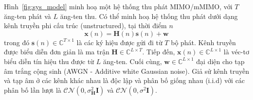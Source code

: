 Hình~\ref{fig:sys_model} minh hoạ một hệ thống thu phát MIMO/mMIMO, với $T$ ăng-ten phát và $L$ ăng-ten thu. Có thể minh hoạ hệ thống thu phát dưới dạng kênh truyền phi cấu trúc (unstructured), tại thời điểm $n$
\begin{equation}
    \mathbf{x}(n) = \mathbf{H}(n)\mathbf{s}(n) + \mathbf{w}
\end{equation}
trong đó $\mathbf{s}(n) \in \mathbb{C}^{T \times 1}$ là các ký hiệu được gửi đi từ $T$ bộ phát. Kênh truyền được biểu diễn đơn giản là ma trận $\mathbf{H} \in \mathbb{C}^{L\times T}$. Tiếp đến, $\mathbf{x}(n) \in \mathbb{C}^{L \times 1}$ là véc-tơ biểu diễn tín hiệu thu được từ $L$ ăng-ten. Cuối cùng, $\mathbf{w} \in \mathbb{C}^{L \times 1}$ đại diện cho tạp âm trắng cộng sinh (AWGN - Additive white Gaussian noise). Giả sử kênh truyền và tạp âm ở các kênh khác nhau là độc lập và phân bố giống nhau (i.i.d) với các phân bố lần lượt là $\mathcal{CN}(0, \sigma_{\mathbf{H}}^2 \mathbf{I})$ và $\mathcal{CN}(0, \sigma^2 \mathbf{I})$. 



